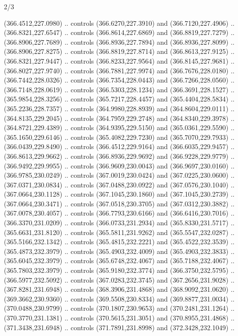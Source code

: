 \begin{flagdescription}{2/3}
\begin{scope}[xshift=0.5\flaglength,yshift=0.5\flagwidth,scale=\flagwidth/495.65]
\begin{scope}[y=0.8pt, x=0.8pt, yscale=-1,shift={(-463.76,-309.78)}]
  (366.4512,227.0980) .. controls (366.6270,227.3910) and (366.7120,227.4906) ..
  (366.8321,227.6547) .. controls (366.8614,227.6869) and (366.8819,227.7279) ..
  (366.8906,227.7689) .. controls (366.8936,227.7894) and (366.8936,227.8099) ..
  (366.8906,227.8275) .. controls (366.8819,227.8714) and (366.8613,227.9125) ..
  (366.8321,227.9447) .. controls (366.8233,227.9564) and (366.8145,227.9681) ..
  (366.8027,227.9740) .. controls (366.7881,227.9974) and (366.7676,228.0180) ..
  (366.7442,228.0326) .. controls (366.7354,228.0443) and (366.7266,228.0560) ..
  (366.7148,228.0619) .. controls (366.5303,228.1234) and (366.3691,228.1527) ..
  (365.9854,228.3256) .. controls (365.7217,228.4457) and (365.4404,228.5834) ..
  (365.2236,228.7357) .. controls (364.9980,228.8939) and (364.8604,229.0111) ..
  (364.8135,229.2045) .. controls (364.7959,229.2748) and (364.8340,229.3978) ..
  (364.8721,229.4389) .. controls (364.9395,229.5150) and (365.0361,229.5590) ..
  (365.1650,229.6146) .. controls (365.4082,229.7230) and (365.7070,229.7933) ..
  (366.0439,229.8490) .. controls (366.4512,229.9164) and (366.6035,229.9457) ..
  (366.8613,229.9662) .. controls (366.8936,229.9692) and (366.9228,229.9779) ..
  (366.9492,229.9955) .. controls (366.9609,230.0043) and (366.9697,230.0160) ..
  (366.9785,230.0249) .. controls (367.0019,230.0424) and (367.0225,230.0600) ..
  (367.0371,230.0834) .. controls (367.0488,230.0922) and (367.0576,230.1040) ..
  (367.0664,230.1128) .. controls (367.1045,230.1860) and (367.1045,230.2739) ..
  (367.0664,230.3471) .. controls (367.0518,230.3705) and (367.0312,230.3882) ..
  (367.0078,230.4057) .. controls (366.7793,230.6166) and (366.6416,230.7016) ..
  (366.3370,231.0209) .. controls (366.0733,231.2934) and (365.8330,231.5717) ..
  (365.6631,231.8120) .. controls (365.5811,231.9262) and (365.5547,232.0287) ..
  (365.5166,232.1342) .. controls (365.4815,232.2221) and (365.4522,232.3539) ..
  (365.4873,232.3979) .. controls (365.4903,232.4009) and (365.4903,232.3833) ..
  (365.6045,232.3979) .. controls (365.6748,232.4067) and (365.7188,232.4067) ..
  (365.7803,232.3979) .. controls (365.9180,232.3774) and (366.3750,232.5795) ..
  (366.5977,232.5092) .. controls (367.0283,232.3745) and (367.2656,231.9028) ..
  (367.8281,231.6948) .. controls (368.3906,231.4868) and (368.9092,231.0620) ..
  (369.3662,230.9360) .. controls (369.5508,230.8334) and (369.8877,231.0034) ..
  (370.0488,230.9799) .. controls (370.1807,230.9653) and (370.2481,231.1264) ..
  (370.3770,231.1381) .. controls (370.5615,231.3051) and (370.8955,231.4868) ..
  (371.3438,231.6948) .. controls (371.7891,231.8998) and (372.3428,232.1049) ..

\end{scope}
\end{scope}
\end{flagdescription}
